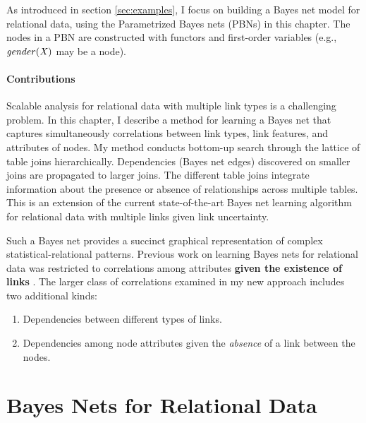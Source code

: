 \documentclass{sfuthesis}
\begin{document}
As introduced in section \ref{sec:examples}, I focus on building a Bayes net model for relational data, using the Parametrized Bayes nets (PBNs) in this chapter. The nodes in a PBN are constructed with functors and first-order variables (e.g., $\it{gender}(X)$ may be a node).

\paragraph{Contributions}
Scalable analysis for relational data with multiple link types is a challenging problem. %
In this chapter, I  describe a method for learning a Bayes net that captures simultaneously correlations between link types, link features, and attributes of nodes.  My method conducts bottom-up search  through the lattice of table joins hierarchically. Dependencies (Bayes net edges) discovered on smaller joins are propagated to larger joins. The different table joins integrate information about the presence or absence of relationships across multiple tables. This is an extension of the current state-of-the-art Bayes net learning algorithm for relational data with multiple links given link uncertainty\cite{Schulte2012}. %
 
Such a Bayes net provides a succinct graphical representation of complex statistical-relational patterns. Previous work on learning Bayes nets for relational data was restricted to correlations among attributes \textbf{given the existence of links} \cite{Schulte2012}. The larger class of correlations examined in my new approach includes two additional kinds:
\begin{enumerate}
\item Dependencies between  different types of links.
\item Dependencies among node attributes given the {\em absence} of a link between the nodes.
\end{enumerate}



\section{Bayes Nets for Relational Data}
\end{document}
